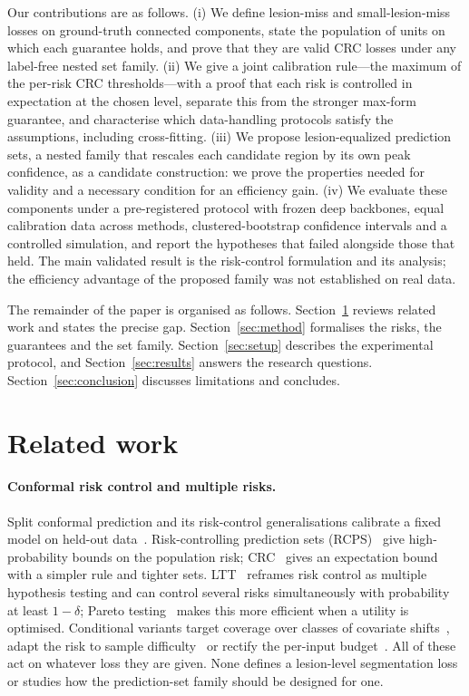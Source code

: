 \documentclass[sn-mathphys-num]{sn-jnl}%
\theoremstyle{thmstyleone}
\theoremstyle{thmstyletwo}
\theoremstyle{thmstylethree}
\newcommand{\1}{\mathbb{1}}
\begin{document}
Our contributions are as follows. (i) We define lesion-miss and small-lesion-miss losses on ground-truth connected components, state the population of units on which each guarantee holds, and prove that they are valid CRC losses under any label-free nested set family. (ii) We give a joint calibration rule---the maximum of the per-risk CRC thresholds---with a proof that each risk is controlled in expectation at the chosen level, separate this from the stronger max-form guarantee, and characterise which data-handling protocols satisfy the assumptions, including cross-fitting. (iii) We propose lesion-equalized prediction sets, a nested family that rescales each candidate region by its own peak confidence, as a candidate construction: we prove the properties needed for validity and a necessary condition for an efficiency gain. (iv) We evaluate these components under a pre-registered protocol with frozen deep backbones, equal calibration data across methods, clustered-bootstrap confidence intervals and a controlled simulation, and report the hypotheses that failed alongside those that held. The main validated result is the risk-control formulation and its analysis; the efficiency advantage of the proposed family was not established on real data.

The remainder of the paper is organised as follows. Section~\ref{sec:related} reviews related work and states the precise gap. Section~\ref{sec:method} formalises the risks, the guarantees and the set family. Section~\ref{sec:setup} describes the experimental protocol, and Section~\ref{sec:results} answers the research questions. Section~\ref{sec:conclusion} discusses limitations and concludes.

\section{Related work}\label{sec:related}

\paragraph{Conformal risk control and multiple risks.}
Split conformal prediction and its risk-control generalisations calibrate a fixed model on held-out data~\cite{angelopoulos2023gentle}. Risk-controlling prediction sets (RCPS)~\cite{bates2021rcps} give high-probability bounds on the population risk; CRC~\cite{angelopoulos2024crc} gives an expectation bound with a simpler rule and tighter sets. LTT~\cite{angelopoulos2025ltt} reframes risk control as multiple hypothesis testing and can control several risks simultaneously with probability at least $1-\delta$; Pareto testing~\cite{laufer2023pareto} makes this more efficient when a utility is optimised. Conditional variants target coverage over classes of covariate shifts~\cite{gibbs2025conditional}, adapt the risk to sample difficulty~\cite{blot2025aacrc} or rectify the per-input budget~\cite{resende2026recirc}. All of these act on whatever loss they are given. None defines a lesion-level segmentation loss or studies how the prediction-set family should be designed for one.
\end{document}
